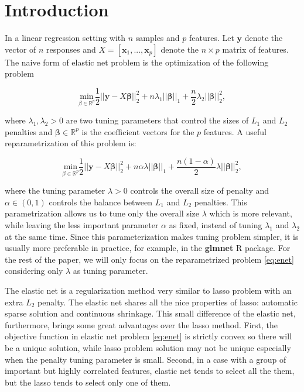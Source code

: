 \label{METHOD3}

\section{Introduction}

In a linear regression setting with $n$ samples and $p$ features. Let $\boldsymbol y$ denote the vector of $n$ responses and $X=[\boldsymbol x_1,...,\boldsymbol x_p]$ denote the $n\times p$ matrix of features. The naive form of elastic net problem \citep{zou2005regularization} is the optimization of the following problem 

\begin{equation}
    \label{eq:enet0}
    \underset{\beta\in \mathbb{R}^p}{\mathrm{min}}\frac{1}{2}||\boldsymbol y-X\boldsymbol\beta||_2^2+n\lambda_1||\boldsymbol\beta||_1+\frac{n}{2}\lambda_2||\boldsymbol\beta||_2^2,
\end{equation}

where $\lambda_1,\lambda_2> 0$ are two tuning parameters that control the sizes of $L_1$ and $L_2$ penalties and $\boldsymbol\beta\in\mathbb{R}^p$ is the coefficient vectors for the $p$ features. A useful reparametrization of this problem is:

\begin{equation}
    \label{eq:enet}
    \underset{\beta\in \mathbb{R}^p}{\mathrm{min}}\frac{1}{2}||\boldsymbol y-X\boldsymbol\beta||_2^2+n\alpha\lambda||\boldsymbol\beta||_1+\frac{n(1-\alpha)}{2}\lambda||\boldsymbol\beta||_2^2,
\end{equation}

where the tuning parameter $\lambda>0$ controls the overall size of penalty and $\alpha\in(0,1)$ controls the balance between $L_1$ and $L_2$ penalties. This parametrization allows us to tune only the overall size $\lambda$ which is more relevant, while leaving the less important parameter $\alpha$ as fixed, instead of tuning $\lambda_1$ and $\lambda_2$ at the same time. Since this parameterization makes tuning problem simpler, it is usually more preferable in practice, for example, in the \textbf{glmnet} R package. For the rest of the paper, we will only focus on the reparametrized problem \eqref{eq:enet} considering only $\lambda$ as tuning parameter.

The elastic net is a regularization method very similar to lasso problem \citep{tibshirani1996regression} with an extra $L_2$ penalty. The elastic net shares all the nice properties of lasso: automatic sparse solution and continuous shrinkage. This small difference of the elastic net, furthermore, brings some great advantages over the lasso method. First, the objective function in elastic net problem \eqref{eq:enet} is strictly convex so there will be a unique solution, while lasso problem solution may not be unique especially when the penalty tuning parameter is small. Second, in a case with a group of important but highly correlated features, elastic net tends to select all the them, but the lasso tends to select only one of them.

